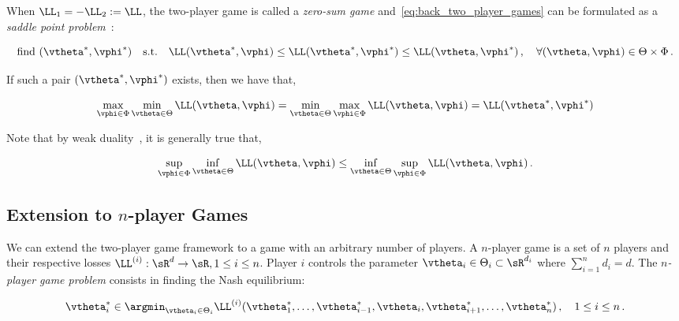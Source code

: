 When $\LL_1 = - \LL_2 := \LL$, the two-player game is called a \emph{zero-sum game} and~\eqref{eq:back_two_player_games} can be formulated as a \emph{saddle point problem}~\citep[VII.4]{hiriart1993convex}:

\begin{equation}\label{eq:def_sp}
\text{find } (\vtheta^*,\vphi^*) \quad \text{s.t.} \quad \LL(\vtheta^*,\vphi) \leq \LL(\vtheta^*,\vphi^*) \leq \LL(\vtheta,\vphi^*) \,,\quad \forall (\vtheta,\vphi) \in \Theta \times \Phi\,.
\end{equation}

If such a pair $(\vtheta^*,\vphi^*)$ exists, then we have that,

\begin{equation}
\max_{\vphi \in \Phi} \min_{\vtheta \in \Theta} \LL(\vtheta, \vphi) 
= \min_{\vtheta \in \Theta} \max_{\vphi \in \Phi} \LL(\vtheta,\vphi) 
= \LL(\vtheta^*,\vphi^*)
\end{equation}

Note that by weak duality~\citep{rockafellar1970convex}, it is generally true that, 

\begin{equation} \label{eq:back_minimax}
\sup_{\vphi \in \Phi} \inf_{\vtheta \in \Theta} \LL(\vtheta, \vphi) \leq \inf_{\vtheta \in \Theta} \sup_{\vphi \in \Phi} \LL(\vtheta,\vphi)\,.
\end{equation}










\subsection{Extension to $n$-player Games}




We can extend the two-player game framework to a game with an arbitrary number of players. A $n$-player game is a set of $n$ players and their respective losses $\LL^{(i)}: \sR^d \to \sR, 1\leq i \leq n$. Player $i$ controls the parameter $\vtheta_i \in \Theta_i \subset \sR^{d_i}$ where $\sum_{i=1}^n d_i = d$. The \emph{$n$-player game problem} consists in finding the Nash equilibrium: 

\begin{equation}\label{eq:def_nash_equ}
\vtheta_i^* \in \argmin_{\vtheta_i \in \Theta_i} \LL^{(i)}(\vtheta_1^*,\ldots,\vtheta_{i-1}^*,\vtheta_i,\vtheta_{i+1}^*,\ldots,\vtheta_n^*) \,, \quad 1\leq i\leq n\,.
\end{equation} 

